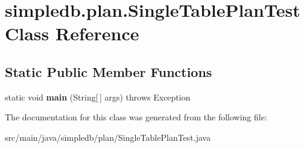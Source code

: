 \hypertarget{classsimpledb_1_1plan_1_1SingleTablePlanTest}{}\section{simpledb.\+plan.\+Single\+Table\+Plan\+Test Class Reference}
\label{classsimpledb_1_1plan_1_1SingleTablePlanTest}
\subsection*{Static Public Member Functions}
\begin{DoxyCompactItemize}
\item 
\mbox{\label{classsimpledb_1_1plan_1_1SingleTablePlanTest_a1b4e2176b310c5aacddc6607c5e495ba}} 
static void {\bfseries main} (String\mbox{[}$\,$\mbox{]} args)  throws Exception 
\end{DoxyCompactItemize}


The documentation for this class was generated from the following file\+:\begin{DoxyCompactItemize}
\item 
src/main/java/simpledb/plan/Single\+Table\+Plan\+Test.\+java\end{DoxyCompactItemize}
